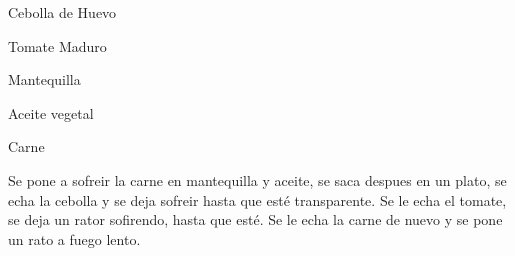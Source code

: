 

\begin{ingredientes}
\item Cebolla de Huevo
\item Tomate Maduro
\item Mantequilla
\item Aceite vegetal
\item Carne
\end{ingredientes}
\preparacion
Se pone a sofreir la carne en mantequilla y aceite, se saca despues en un plato, se echa la cebolla y se deja sofreir hasta que esté transparente. Se le echa el tomate, se deja un rator sofirendo, hasta que esté. Se le echa la carne de nuevo y se pone un rato a fuego lento.

